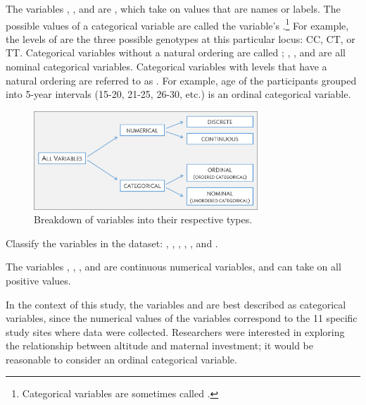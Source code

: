 The variables , , and  are , which take on values that are names or labels. The possible values of a categorical variable are called the variable's .\footnote{Categorical variables are sometimes called .}  For example, the levels of  are the three possible genotypes at this particular locus: CC, CT, or TT.  Categorical variables without a natural ordering are called ; , , and  are all nominal categorical variables. Categorical variables with levels that have a natural ordering are referred to as . For example, age of the participants grouped into 5-year intervals (15-20, 21-25, 26-30, etc.) is an ordinal categorical variable.  

\begin{figure}
\centering
\includegraphics[width=0.75\textwidth]{ch_intro_to_data_oi_biostat/figures/variables/variableTypes.png}
\caption{Breakdown of variables into their respective types.}
\label{variableTypesFig}
\end{figure}

\begin{examplewrap}
\begin{nexample}{Classify the variables in the  dataset: , , , , , and .}

The variables , , , and  are continuous numerical variables, and can take on all positive values.

In the context of this study, the variables  and  are best described as categorical variables, since the numerical values of the variables correspond to the 11 specific study sites where data were collected. Researchers were interested in exploring the relationship between altitude and maternal investment; it would be reasonable to consider  an ordinal categorical variable.
\end{nexample}
\end{examplewrap}

